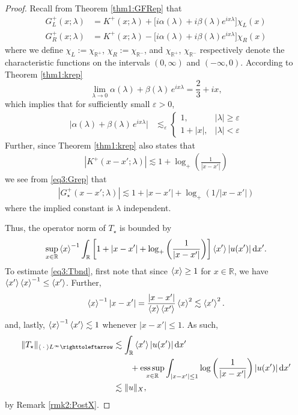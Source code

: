 \documentclass[../dissertation]{subfiles}
\begin{document}
\begin{proof}
	Recall from Theorem \ref{thm1:GFRep} that
	\begin{subequations}\label{eq3:Grep}
		\begin{align}
			G_L^+(x; \lambda) 
				&= K^+(x; \lambda) + 
				\big[i \alpha(\lambda) + i \beta(\lambda) e^{ix \lambda}\big]
					 \chi_L(x) \\
			G_R^+(x; \lambda)
				&= K^+(x; \lambda) -
				\big[i \alpha(\lambda) + i \beta(\lambda) e^{ix \lambda}\big]
					 \chi_R(x)
		\end{align}
	\end{subequations}
	where we define $\chi_L:=\chi_{\mathbb R^+}$,  $\chi_R:= \chi_{\mathbb R^-}$,
	and $\chi_{\mathbb R^+}$, $\chi_{\mathbb R^-}$
	respectively denote the characteristic functions on the intervals
	$(0, \infty)$ and $(-\infty, 0)$.
	According to Theorem \ref{thm1:krep}
	\[
		\lim_{\lambda \to 0} 
			\alpha(\lambda) + \beta(\lambda) \, e^{ix\lambda}
			= \frac{2}{3} + i x,
	\]
	which implies that for suf{}ficiently small $\varepsilon > 0$, 
	\begin{align}\label{eq2:polesumbnd}
		\big| \alpha(\lambda) + \beta(\lambda) \, e^{ix\lambda} \big|
			&\lesssim_{\varepsilon}
				\begin{cases}
					1, & |\lambda| \geq \varepsilon \\
					1 + |x|, & |\lambda| < \varepsilon
				\end{cases}
	\end{align}
	Further, since Theorem \ref{thm1:krep} also states that 
	\begin{align*}
		|K^+(x-x'; \lambda)| \lesssim 1 + \log_+\left(\frac{1}{|x-x'|}\right) 
	\end{align*}
	we see from \eqref{eq3:Grep} that 
	\begin{align}
		|G_\star^+ (x - x'; \lambda)|
			\lesssim 1 + |x-x'| + \log_+(1/|x-x'|)
	\end{align}
	where the implied constant is $\lambda$ independent. 

	Thus, the operator norm of $T_\star$
	is bounded by 
	\begin{align}\label{eq3:Tbnd}
		\sup_{x\in \mathbb R} \left\langle x \right\rangle^{-1}
				\int_{\mathbb R}
					\left[1 + |x-x'| + \log_+\left(\frac{1}{|x-x'|}\right)\right]
					\left\langle x' \right\rangle |u(x')|
				\, \mathrm{d}x'.
	\end{align}
	To estimate \eqref{eq3:Tbnd}, first note that 
	since $\left\langle x \right\rangle \geq 1$ for $x\in \mathbb R$, we have $\left\langle x' \right\rangle\left\langle x \right\rangle^{-1} 
	\leq \left\langle x' \right\rangle$. Further, 
	\[
		\left\langle x \right\rangle^{-1} |x - x'| 
			= \frac{|x-x'|}{\left\langle x \right\rangle\left\langle x' \right\rangle}\left\langle x \right\rangle^2 
			\lesssim \left\langle x' \right\rangle^2.
	\]
	and, lastly, $\left\langle x \right\rangle^{-1} \left\langle x' \right\rangle \lesssim 1$ whenever $|x-x'|\leq 1$. 
	As such, 
	\begin{align*}
		\|T_\star\|_{\inn{\dotarg} L^\infty \toitself}
			&\lesssim 
				\int_{\mathbb R} \inn{x'} |u(x')| \, \mathrm{d}x' 
				\\
			&\qquad+ \esssup_{x\in \mathbb R} 
				\int_{|x-x'|\leq 1} 
					\log\left(\frac{1}{|x-x'|}\right)
					|u(x')|
				\, \mathrm{d}x' 
				\\
		&\lesssim \|u\|_X,
	\end{align*}
	by Remark \ref{rmk2:PostX}.
\end{proof}
\end{document}
